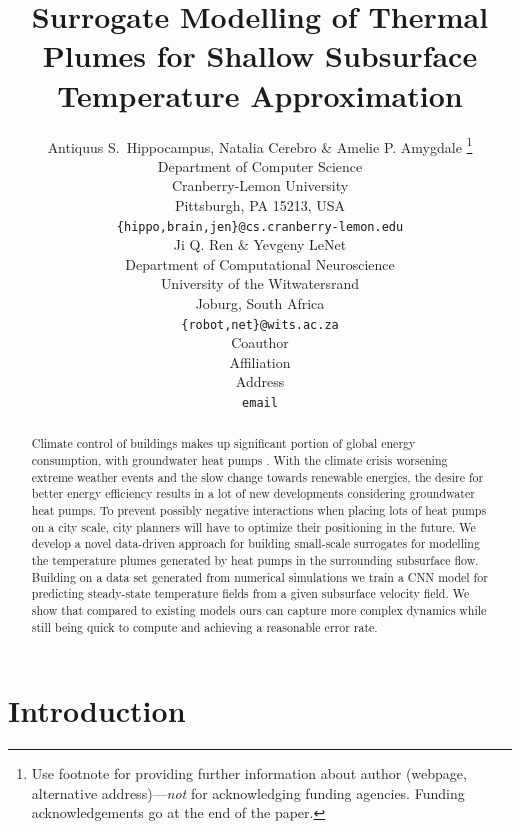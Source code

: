 \documentclass{article} %
\title{Surrogate Modelling of Thermal Plumes for Shallow Subsurface Temperature Approximation}
\author{Antiquus S.~Hippocampus, Natalia Cerebro \& Amelie P. Amygdale \thanks{ Use footnote for providing further information
about author (webpage, alternative address)---\emph{not} for acknowledging
funding agencies.  Funding acknowledgements go at the end of the paper.} \\
Department of Computer Science\\
Cranberry-Lemon University\\
Pittsburgh, PA 15213, USA \\
\texttt{\{hippo,brain,jen\}@cs.cranberry-lemon.edu} \\
\And
Ji Q. Ren \& Yevgeny LeNet \\
Department of Computational Neuroscience \\
University of the Witwatersrand \\
Joburg, South Africa \\
\texttt{\{robot,net\}@wits.ac.za} \\
\AND
Coauthor \\
Affiliation \\
Address \\
\texttt{email}
}
\begin{document}
\maketitle

\begin{abstract}
   Climate control of buildings makes up significant portion of global energy consumption, with groundwater heat pumps .
   With the climate crisis worsening extreme weather events and the slow change towards renewable energies, the desire for better energy efficiency results in a lot of new developments considering groundwater heat pumps.
   To prevent possibly negative interactions when placing lots of heat pumps on a city scale, city planners will have to optimize their positioning in the future.
   We develop a novel data-driven approach for building small-scale surrogates for modelling the temperature plumes generated by heat pumps in the surrounding subsurface flow.
   Building on a data set generated from numerical simulations we train a CNN model for predicting steady-state temperature fields from a given subsurface velocity field.
   We show that compared to existing models ours can capture more complex dynamics while still being quick to compute and achieving a reasonable error rate.
\end{abstract}

\section{Introduction}
\label{sec:intro}
\end{document}
